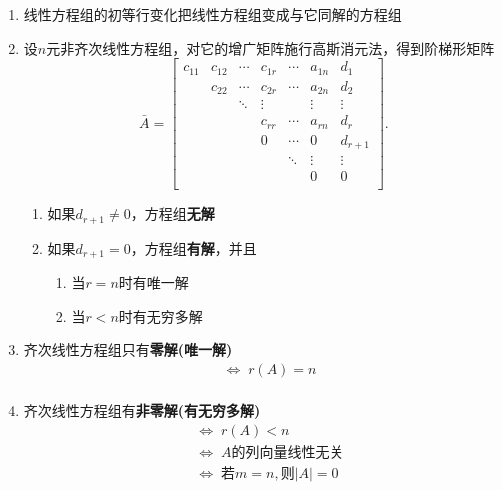 \documentclass[a4paper,12pt]{article}
\begin{document}
    \begin{enumerate}
        \item 线性方程组的初等行变化把线性方程组变成与它同解的方程组
        \item 设$n$元非齐次线性方程组，对它的增广矩阵施行高斯消元法，得到阶梯形矩阵
        \[
            \bar A =
            \begin{bmatrix}
                c_{11} & c_{12} & \cdots & c_{1r} & \cdots & a_{1n} & d_1     \\
                & c_{22} & \cdots & c_{2r} & \cdots & a_{2n} & d_2     \\
                &        & \ddots & \vdots &        & \vdots & \vdots  \\
                &        &        & c_{rr} & \cdots & a_{rn} & d_r     \\
                &        &        & 0      & \cdots & 0      & d_{r+1} \\
                &        &        &        & \ddots & \vdots & \vdots  \\
                &        &        &        &        & 0      & 0       \\
            \end{bmatrix}.
        \]
        \begin{enumerate}
            \item 如果$d_{r+1} \neq 0$，方程组\textbf{无解}
            \item 如果$d_{r+1} = 0$，方程组\textbf{有解}，并且
            \begin{enumerate}
                \item 当$r = n$时有唯一解
                \item 当$r < n$时有无穷多解
            \end{enumerate}
        \end{enumerate}
        \item 齐次线性方程组只有\textbf{零解(唯一解)}
        \begin{align*}
            &\Leftrightarrow\; r(A) = n  \\
        \end{align*}
        \item 齐次线性方程组有\textbf{非零解(有无穷多解)}
        \begin{align*}
            &\Leftrightarrow\; r(A) < n  \\
            &\Leftrightarrow\; A\text{的列向量线性无关} \\
            &\Leftrightarrow\; \text{若} m = n, \text{则} |A| = 0

\end{align*}
\end{enumerate}
\end{document}
